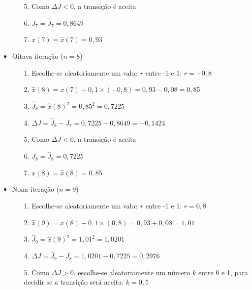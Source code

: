 \documentclass{report}
\begin{document}
\begin{itemize}
\begin{itemize}
\item[5.] Como $\Delta J < 0$, a transição é aceita

\item[6.] $J_{7} = \hat{J}_{7} = 0,8649$

\item[7.] $x(7) = \hat{x}(7) = 0,93$

\end{itemize}

\item Oitava iteração ($n = 8$)

\begin{itemize}

\item[1.] Escolhe-se aleatoriamente um valor $r$ entre -1 e 1: $r = -0,8$

\item[2.] $\hat{x}(8) = x(7) + 0,1 \times (-0,8) = 0,93 - 0,08 = 0,85$

\item[3.] $\hat{J}_{8} = \hat{x}(8)^2 = 0,85^2 = 0,7225$

\item[4.] $\Delta J = \hat{J}_{8} - J_{7} = 0,7225 - 0,8649 = -0,1424$

\item[5.] Como $\Delta J < 0$, a transição é aceita

\item[6.] $J_{8} = \hat{J}_{8} = 0,7225$

\item[7.] $x(8) = \hat{x}(8) = 0,85$

\end{itemize}

\item Nona iteração ($n = 9$)

\begin{itemize}

\item[1.] Escolhe-se aleatoriamente um valor $r$ entre -1 e 1: $r = 0,8$

\item[2.] $\hat{x}(9) = x(8) + 0,1 \times (0,8) = 0,93 + 0,08 = 1,01$

\item[3.] $\hat{J}_{9} = \hat{x}(9)^2 = 1,01^2 = 1,0201$

\item[4.] $\Delta J = \hat{J}_{9} - J_{8} = 1,0201 - 0,7225 = 0,2976$

\item[5.] Como $\Delta J > 0$, escolhe-se aleatoriamente um número $k$ entre 0 e 1, para decidir se a transição será aceita: $k = 0,5$


\end{itemize}
\end{itemize}
\end{document}
